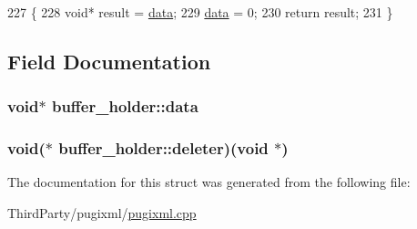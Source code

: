 \begin{DoxyCode}
227         \{
228             \textcolor{keywordtype}{void}* result = \hyperlink{structbuffer__holder_a06c1e1004fac90848dfdb4fbc150cede}{data};
229             \hyperlink{structbuffer__holder_a06c1e1004fac90848dfdb4fbc150cede}{data} = 0;
230             \textcolor{keywordflow}{return} result;
231         \}
\end{DoxyCode}


\subsection{Field Documentation}
\hypertarget{structbuffer__holder_a06c1e1004fac90848dfdb4fbc150cede}{
\subsubsection[{data}]{\setlength{\rightskip}{0pt plus 5cm}void$\ast$ buffer\-\_\-holder\-::data}}\label{structbuffer__holder_a06c1e1004fac90848dfdb4fbc150cede}
\hypertarget{structbuffer__holder_a96e7067c68bc1f7a9ee7dd75c84f04e8}{
\subsubsection[{deleter}]{\setlength{\rightskip}{0pt plus 5cm}void($\ast$ buffer\-\_\-holder\-::deleter)(void $\ast$)}}\label{structbuffer__holder_a96e7067c68bc1f7a9ee7dd75c84f04e8}


The documentation for this struct was generated from the following file\-:\begin{DoxyCompactItemize}
\item 
Third\-Party/pugixml/\hyperlink{pugixml_8cpp}{pugixml.\-cpp}\end{DoxyCompactItemize}
